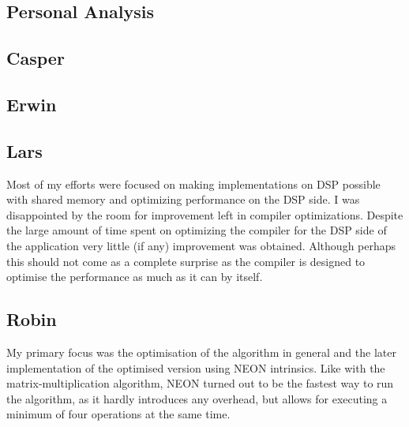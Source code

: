 \documentclass[final]{article} %
\begin{document}
\begin{appendices}

\section{Personal Analysis}\label{app:appendix-personal-analysis}

\subsection{Casper}


\subsection{Erwin}


\subsection{Lars}
Most of my efforts were focused on making implementations on DSP possible with shared memory and optimizing performance on the DSP side. I was disappointed by the room for improvement left in compiler optimizations. Despite the large amount of time spent on optimizing the compiler for the DSP side of the application very little (if any) improvement was obtained. Although perhaps this should not come as a complete surprise as the compiler is designed to optimise the performance as much as it can by itself.

\subsection{Robin}
My primary focus was the optimisation of the algorithm in general and the later implementation of the optimised version using NEON intrinsics. Like with the matrix-multiplication algorithm, NEON turned out to be the fastest way to run the algorithm, as it hardly introduces any overhead, but allows for executing a minimum of four operations at the same time.


\end{appendices}
\end{document}
